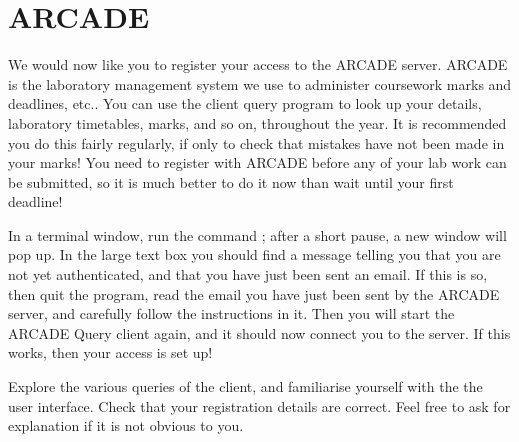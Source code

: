 





\FloatBarrier

\section{ARCADE}

We would now like you to register your access to the ARCADE server. ARCADE is the laboratory management system we use to administer coursework marks and deadlines, etc.. You can use the client query program to look up your details, laboratory timetables, marks, and so on, throughout the year. It is recommended you do this fairly regularly, if only to check that mistakes have not been made in your marks! You need to register with ARCADE before any of your lab work can be submitted, so it is much better to do it now than wait until your first deadline!

In a terminal window, run the command ; after a short pause, a new window will pop up. In the large text box you should find a message telling you that you are not yet authenticated, and that you have just been sent an email. If this is so, then quit the program, read the email you have just been sent by the ARCADE server, and carefully follow the instructions in it. Then you will start the ARCADE Query client again, and it should now connect you to the server. If this works, then your access is set up!

Explore the various queries of the client, and familiarise yourself with the the user interface. Check that your registration details are correct. Feel free to ask for explanation if it is not obvious to you.

